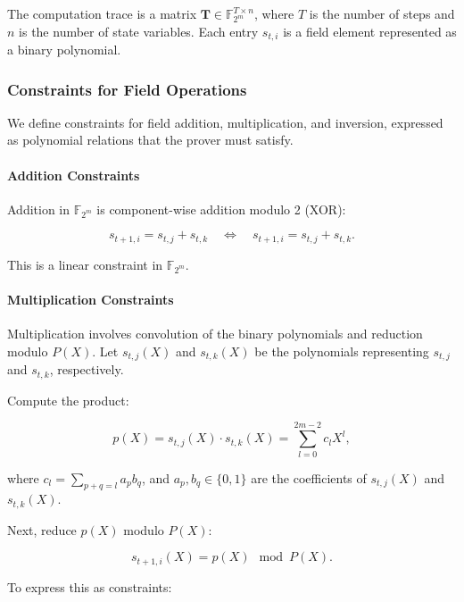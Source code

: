 \documentclass{article}
\theoremstyle{plain}
\theoremstyle{definition}
\theoremstyle{remark}
\theoremstyle{problem}
\begin{document}
The computation trace is a matrix $\mathbf{T} \in \mathbb{F}_{2^m}^{T \times n}$, where $T$ is the number of steps and $n$ is the number of state variables. Each entry $s_{t,i}$ is a field element represented as a binary polynomial.

\subsubsection{Constraints for Field Operations}

We define constraints for field addition, multiplication, and inversion, expressed as polynomial relations that the prover must satisfy.

\paragraph{Addition Constraints}

Addition in $\mathbb{F}_{2^m}$ is component-wise addition modulo 2 (XOR):

\[
s_{t+1,i} = s_{t,j} + s_{t,k} \quad \Longleftrightarrow \quad s_{t+1,i} = s_{t,j} + s_{t,k}.
\]

This is a linear constraint in $\mathbb{F}_{2^m}$.

\paragraph{Multiplication Constraints}

Multiplication involves convolution of the binary polynomials and reduction modulo $P(X)$. Let $s_{t,j}(X)$ and $s_{t,k}(X)$ be the polynomials representing $s_{t,j}$ and $s_{t,k}$, respectively.

Compute the product:

\[
p(X) = s_{t,j}(X) \cdot s_{t,k}(X) = \sum_{l=0}^{2m-2} c_l X^l,
\]

where $c_l = \sum_{p+q=l} a_p b_q$, and $a_p, b_q \in \{0,1\}$ are the coefficients of $s_{t,j}(X)$ and $s_{t,k}(X)$.

Next, reduce $p(X)$ modulo $P(X)$:

\[
s_{t+1,i}(X) = p(X) \mod P(X).
\]

To express this as constraints:
\end{document}
